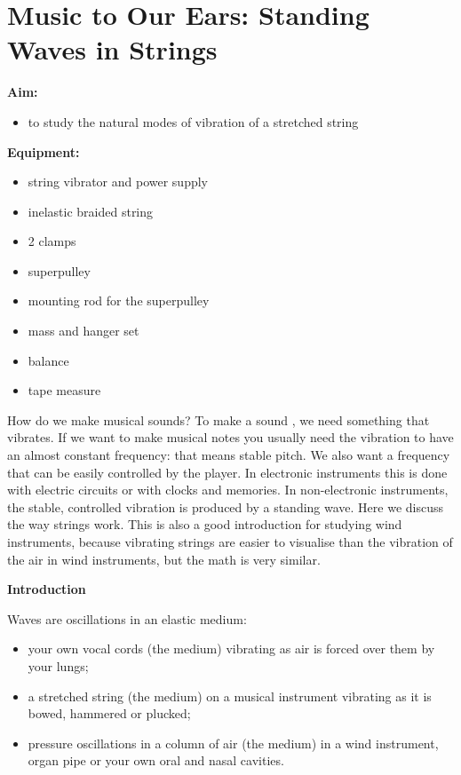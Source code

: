 \section{Music to Our Ears: Standing Waves in Strings}

\makelabheader %

\textbf{Aim:}
\begin{itemize}
\item  to study the natural modes of vibration of a stretched string
\end{itemize}

\textbf{Equipment:}
\begin{itemize}
\item  string vibrator and power supply
\item  inelastic braided string
\item  2 clamps
\item  superpulley
\item  mounting rod for the superpulley
\item  mass and hanger set
\item  balance
\item  tape measure
\end{itemize}


How do we make musical sounds? To make a sound , we need something that vibrates. If we want to make musical notes you usually need the vibration to
have an almost constant frequency: that means stable pitch. We also want a frequency that can be easily controlled by the player. In electronic
instruments this is done with electric circuits or with clocks and memories. In non-electronic instruments, the stable, controlled vibration is
produced by a standing wave. Here we discuss the way strings work. This is also a good introduction for studying wind instruments, because vibrating
strings are easier to visualise than the vibration of the air in wind instruments, but the math is very similar.

\textbf{Introduction}

Waves are oscillations in an elastic medium:

\begin{itemize}
\item  your own vocal cords (the medium) vibrating as air is forced over them by your lungs; 
\item  a stretched string (the medium) on a musical instrument vibrating as it is bowed, hammered or plucked; 
\item  pressure oscillations in a column of air (the medium) in a wind instrument, organ pipe or your own oral and nasal cavities.
\end{itemize}

